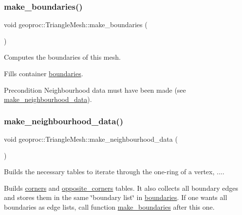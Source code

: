 \subsubsection{\texorpdfstring{make\+\_\+boundaries()}{make\_boundaries()}}
{\footnotesize\ttfamily void geoproc\+::\+Triangle\+Mesh\+::make\+\_\+boundaries (\begin{DoxyParamCaption}{ }\end{DoxyParamCaption})}



Computes the boundaries of this mesh. 

Fills container \hyperlink{classgeoproc_1_1TriangleMesh_a57162eac37831c87786a8dab8331d72f}{boundaries}. \begin{DoxyPrecond}{Precondition}
Neighbourhood data must have been made (see \hyperlink{classgeoproc_1_1TriangleMesh_a84003dfdfd5e591c00f01a797578ff1f}{make\+\_\+neighbourhood\+\_\+data}). 
\end{DoxyPrecond}
\mbox{\label{classgeoproc_1_1TriangleMesh_a84003dfdfd5e591c00f01a797578ff1f}} 
\subsubsection{\texorpdfstring{make\+\_\+neighbourhood\+\_\+data()}{make\_neighbourhood\_data()}}
{\footnotesize\ttfamily void geoproc\+::\+Triangle\+Mesh\+::make\+\_\+neighbourhood\+\_\+data (\begin{DoxyParamCaption}{ }\end{DoxyParamCaption})}



Builds the necessary tables to iterate through the one-\/ring of a vertex, .... 

Builds \hyperlink{classgeoproc_1_1TriangleMesh_ab9610d614e081deb28010d237fecd55b}{corners} and \hyperlink{classgeoproc_1_1TriangleMesh_a2604795c90c694116513252b86d242b4}{opposite\+\_\+corners} tables. It also collects all boundary edges and stores them in the same \char`\"{}boundary list\char`\"{} in \hyperlink{classgeoproc_1_1TriangleMesh_a57162eac37831c87786a8dab8331d72f}{boundaries}. If one wants all boundaries as edge lists, call function \hyperlink{classgeoproc_1_1TriangleMesh_ad11c9406e2677e4d72d53837206fd769}{make\+\_\+boundaries} after this one.

